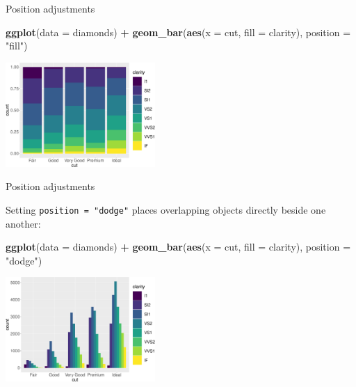 \documentclass[ignorenonframetext,]{beamer}
\newenvironment{Shaded}{\begin{snugshade}}{\end{snugshade}}
\newcommand{\DataTypeTok}[1]{\textcolor[rgb]{0.13,0.29,0.53}{#1}}
\newcommand{\KeywordTok}[1]{\textcolor[rgb]{0.13,0.29,0.53}{\textbf{#1}}}
\newcommand{\NormalTok}[1]{#1}
\newcommand{\OperatorTok}[1]{\textcolor[rgb]{0.81,0.36,0.00}{\textbf{#1}}}
\newcommand{\StringTok}[1]{\textcolor[rgb]{0.31,0.60,0.02}{#1}}
\begin{document}
\begin{frame}[fragile]{Position adjustments}
\protect\hypertarget{position-adjustments-2}{}

\begin{Shaded}
\begin{Highlighting}[]
\KeywordTok{ggplot}\NormalTok{(}\DataTypeTok{data =}\NormalTok{ diamonds) }\OperatorTok{+}\StringTok{ }
\StringTok{  }\KeywordTok{geom_bar}\NormalTok{(}\KeywordTok{aes}\NormalTok{(}\DataTypeTok{x =}\NormalTok{ cut, }\DataTypeTok{fill =}\NormalTok{ clarity), }
           \DataTypeTok{position =} \StringTok{"fill"}\NormalTok{)}
\end{Highlighting}
\end{Shaded}

\begin{center}\includegraphics[height=150px]{data-visualization_files/figure-beamer/unnamed-chunk-127-1} \end{center}

\end{frame}

\begin{frame}[fragile]{Position adjustments}
\protect\hypertarget{position-adjustments-3}{}

Setting \texttt{position\ =\ "dodge"} places overlapping objects
directly beside one another:

\begin{Shaded}
\begin{Highlighting}[]
\KeywordTok{ggplot}\NormalTok{(}\DataTypeTok{data =}\NormalTok{ diamonds) }\OperatorTok{+}\StringTok{ }
\StringTok{  }\KeywordTok{geom_bar}\NormalTok{(}\KeywordTok{aes}\NormalTok{(}\DataTypeTok{x =}\NormalTok{ cut, }\DataTypeTok{fill =}\NormalTok{ clarity), }
           \DataTypeTok{position =} \StringTok{"dodge"}\NormalTok{)}
\end{Highlighting}
\end{Shaded}

\begin{center}\includegraphics[height=150px]{data-visualization_files/figure-beamer/unnamed-chunk-128-1} \end{center}

\end{frame}
\end{document}
